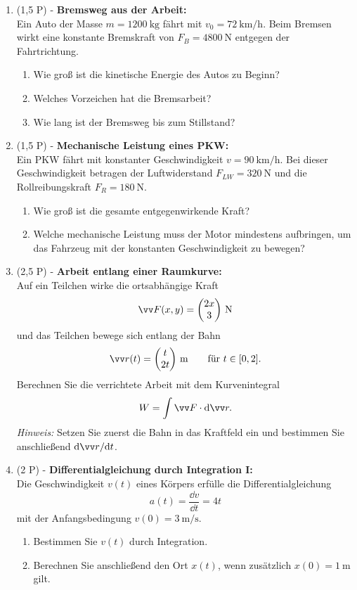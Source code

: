 \documentclass[11pt, a4paper]{article}
\begin{document}
\begin{enumerate}[label=\textbf{\arabic*.},itemsep=0.55cm]
    \item (1,5 P) - \textbf{Bremsweg aus der Arbeit:} \\
    Ein Auto der Masse $m = \SI{1200}{\kilogram}$ fährt mit $v_0 = \SI{72}{\kilo\meter\per\hour}$. Beim Bremsen wirkt eine konstante Bremskraft von $F_B = \SI{4800}{\newton}$ entgegen der Fahrtrichtung.
    \begin{enumerate}[label=(\alph*)]
        \item Wie groß ist die kinetische Energie des Autos zu Beginn?
        \item Welches Vorzeichen hat die Bremsarbeit?
        \item Wie lang ist der Bremsweg bis zum Stillstand?
    \end{enumerate}
    \vspace{2cm}
    \item (1,5 P) - \textbf{Mechanische Leistung eines PKW:} \\
    Ein PKW fährt mit konstanter Geschwindigkeit $v = \SI{90}{\kilo\meter\per\hour}$. Bei dieser Geschwindigkeit betragen der Luftwiderstand $F_{LW} = \SI{320}{\newton}$ und die Rollreibungskraft $F_{R} = \SI{180}{\newton}$.
    \begin{enumerate}[label=(\alph*)]
        \item Wie groß ist die gesamte entgegenwirkende Kraft?
        \item Welche mechanische Leistung muss der Motor mindestens aufbringen, um das Fahrzeug mit der konstanten Geschwindigkeit zu bewegen?
    \end{enumerate}
    \vspace{1cm}
    \item (2,5 P) - \textbf{Arbeit entlang einer Raumkurve:} \\
    Auf ein Teilchen wirke die ortsabhängige Kraft
    \[
        \ivec{F}(x,y) = \icolTwo{2x}{3}\,\si{\newton}
    \]
    und das Teilchen bewege sich entlang der Bahn
    \[
        \ivec{r}(t) = \icolTwo{t}{2t}\,\si{\meter}
        \qquad \text{für } t \in [0,2].
    \]
    Berechnen Sie die verrichtete Arbeit mit dem Kurvenintegral
    \[
        W = \int \ivec{F}\cdot \dd \ivec{r}.
    \]
    \textit{Hinweis:} Setzen Sie zuerst die Bahn in das Kraftfeld ein und bestimmen Sie anschließend $\dd \ivec{r}/\dd t$.
    \vspace{3cm}
    \item (2 P) - \textbf{Differentialgleichung durch Integration I:} \\
    Die Geschwindigkeit $v(t)$ eines Körpers erfülle die Differentialgleichung
    \[
        a(t) = \frac{\dd v}{\dd t} = 4t
    \]
    mit der Anfangsbedingung $v(0)=\SI{3}{\meter\per\second}$.
    \begin{enumerate}[label=(\alph*)]
        \item Bestimmen Sie $v(t)$ durch Integration.
        \item Berechnen Sie anschließend den Ort $x(t)$, wenn zusätzlich $x(0)=\SI{1}{\meter}$ gilt.
    \end{enumerate}

\end{enumerate}
\end{document}
